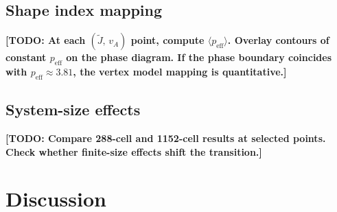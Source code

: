 \documentclass[aps,pre,twocolumn,superscriptaddress,longbibliography]{revtex4-2}
\newcommand{\vA}{v_{\!A}}                  %
\newcommand{\peff}{p_{\mathrm{eff}}}       %
\newcommand{\Jk}{\tilde{J}}                %
\newcommand{\todo}[1]{{\color{red}\textbf{[TODO: #1]}}}
\begin{document}
\subsection{Shape index mapping}
\label{sec:diagram:shape}

\todo{At each $(\Jk,\,\vA)$ point, compute $\langle\peff\rangle$.  Overlay
contours of constant $\peff$ on the phase diagram.  If the phase boundary
coincides with $\peff \approx 3.81$, the vertex model mapping is quantitative.}

\subsection{System-size effects}
\label{sec:diagram:size}

\todo{Compare 288-cell and 1152-cell results at selected points.  Check
whether finite-size effects shift the transition.}


\section{Discussion}
\label{sec:discussion}




\end{document}
